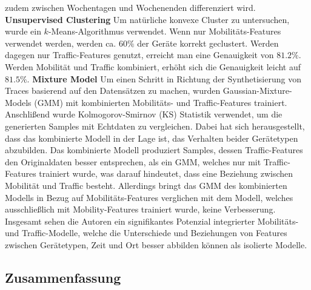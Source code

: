 \documentclass[12pt, a4paper]{article}
\begin{document}
zudem zwischen Wochentagen und Wochenenden differenziert wird.
\newline\newline
\textbf{Unsupervised Clustering}\newline
Um natürliche konvexe Cluster zu untersuchen, wurde ein $k$-Means-Algorithmus verwendet.
Wenn nur Mobilitäts-Features verwendet werden, werden ca. $60 \%$ der Geräte korrekt geclustert.
Werden dagegen nur Traffic-Features genutzt, erreicht man eine Genauigkeit von $81.2 \%$.
Werden Mobilität und Traffic kombiniert, erhöht sich die Genauigkeit leicht auf $81.5 \%$.
\newline\newline
\textbf{Mixture Model}\newline
Um einen Schritt in Richtung der Synthetisierung von Traces basierend auf den Datensätzen zu machen,
wurden Gaussian-Mixture-Models (GMM) mit kombinierten Mobilitäts- und Traffic-Features trainiert.
Anschlißend wurde Kolmogorov-Smirnov (KS) Statistik verwendet, um die generierten Samples mit Echtdaten zu vergleichen.
Dabei hat sich herausgestellt, dass das kombinierte Modell in der Lage ist, das Verhalten beider Gerätetypen abzubilden.
Das kombinierte Modell produziert Samples, dessen Traffic-Features den Originaldaten besser entsprechen, als ein GMM,
welches nur mit Traffic-Features trainiert wurde, was darauf hindeutet, dass eine Beziehung zwischen Mobilität und Traffic besteht.
Allerdings bringt das GMM des kombinierten Modells in Bezug auf Mobilitäts-Features verglichen mit dem Modell, welches 
ausschließlich mit Mobility-Features trainiert wurde, keine Verbesserung.
\newline\newline
Insgesamt sehen die Autoren ein signifikantes Potenzial integrierter Mobilitäts- und Traffic-Modelle, welche die Unterschiede
und Beziehungen von Features zwischen Gerätetypen, Zeit und Ort besser abbilden können als isolierte Modelle.

\subsection{Zusammenfassung}
\end{document}
